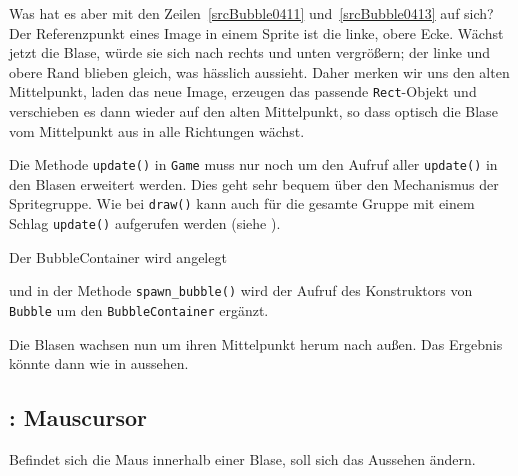 Was hat es aber mit den Zeilen~\ref{srcBubble0411} und~\ref{srcBubble0413} auf sich? Der Referenzpunkt eines Image in einem Sprite ist die linke, obere Ecke. Wächst jetzt die Blase, würde sie sich nach rechts und unten vergrößern; der linke und obere Rand blieben gleich, was hässlich aussieht. Daher merken wir uns den alten Mittelpunkt, laden das neue Image, erzeugen das passende \texttt{Rect}-Objekt und verschieben es dann wieder auf den alten Mittelpunkt, so dass optisch die Blase vom Mittelpunkt aus in alle Richtungen wächst.


Die Methode \texttt{update()} in \texttt{Game} muss nur noch um den Aufruf aller \texttt{update()} in den Blasen erweitert werden. Dies geht sehr bequem über den Mechanismus der Spritegruppe. Wie bei \texttt{draw()} kann auch für die gesamte Gruppe mit einem Schlag \texttt{update()} aufgerufen werden (siehe ).


Der BubbleContainer wird angelegt


und in der Methode \texttt{spawn\_bubble()} wird der Aufruf des Konstruktors von \texttt{Bubble} um den \texttt{BubbleContainer} ergänzt.


Die Blasen wachsen nun um ihren Mittelpunkt herum nach außen. Das Ergebnis könnte dann wie in  aussehen.


\subsection{: Mauscursor}
    Befindet sich die Maus innerhalb einer Blase, soll sich das Aussehen ändern.
\er

